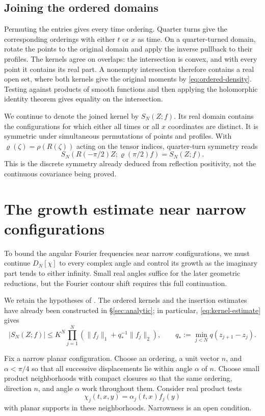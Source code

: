 \subsection{Joining the ordered domains}\label{subsec:joining}

Permuting the entries gives every time ordering. Quarter turns give
the corresponding orderings with either $t$ or $x$ as time. On a
quarter-turned domain, rotate the points to the original domain and
apply the inverse pullback to their profiles. The kernels agree on
overlaps: the intersection is convex, and with every point it contains
its real part. A nonempty intersection therefore contains a real open
set, where both kernels give the original moments by
\eqref{eq:ordered-density}. Testing against products of smooth
functions and then applying the holomorphic identity theorem gives
equality on the intersection.

We continue to denote the joined kernel by $S_N(Z;f)$. Its real domain
contains the configurations for which either all times or all $x$
coordinates are distinct. It is symmetric under simultaneous
permutations of points and profiles. With
$\varrho(\zeta)=\rho(R(\zeta))$ acting on the tensor indices,
quarter-turn symmetry reads
\begin{equation}\label{eq:kernel-quarter}
 S_N(R(-\pi/2)Z;\varrho(\pi/2)f)=S_N(Z;f).
\end{equation}
This is the discrete symmetry already deduced from reflection
positivity, not the continuous covariance being proved.


\section{The growth estimate near narrow configurations}\label{sec:growth}

To bound the angular Fourier frequencies near narrow configurations,
we must continue $D_N[\chi]$ to every complex angle and control its
growth as the imaginary part tends to either infinity. Small real
angles suffice for the later geometric reductions, but the Fourier
contour shift requires this full continuation.

We retain the hypotheses of . The ordered kernels and
the insertion estimates have already been constructed in
\S\ref{sec:analytic}; in particular, \eqref{eq:kernel-estimate} gives
\[
 |S_N(Z;f)|\le K^N\prod_{j=1}^N
       (\|f_j\|_1+q_*^{-1}\|f_j\|_2),
 \qquad q_*:=\min_{j<N}q(z_{j+1}-z_j).
\]

Fix a narrow planar configuration. Choose an ordering, a unit vector
$n$, and $\alpha<\pi/4$ so that all successive displacements lie
within angle $\alpha$ of $n$. Choose small product neighborhoods with
compact closures so that the same ordering, direction $n$, and
angle $\alpha$ work throughout them. Consider real product tests
\[
 \chi_j(t,x,y)=\alpha_j(t,x)f_j(y)
\]
with planar supports in these neighborhoods. Narrowness is an open condition.

